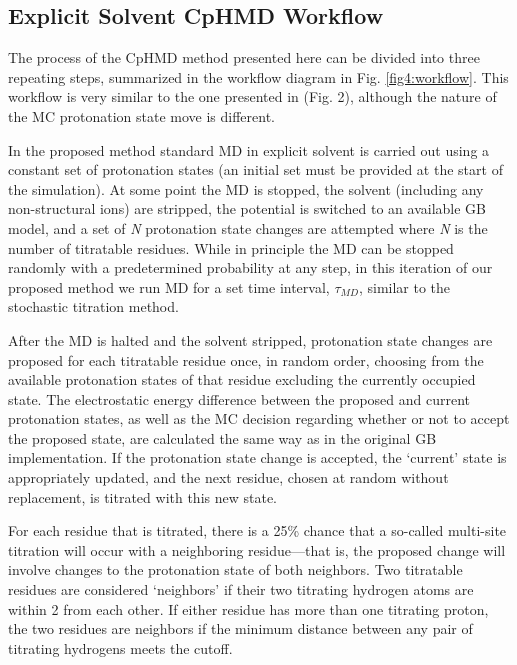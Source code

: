 \subsection{Explicit Solvent CpHMD Workflow}

The process of the CpHMD method presented here can be divided into three
repeating steps, summarized in the workflow diagram in Fig. \ref{fig4:workflow}.
This workflow is very similar to the one presented in
\citeauthor{Baptista_JChemPhys_2002_v117_p4184} (Fig. 2),
\cite{Baptista_JChemPhys_2002_v117_p4184} although the nature of the MC
protonation state move is different.

In the proposed method standard MD in explicit solvent is carried out using a
constant set of protonation states (an initial set must be provided at the start
of the simulation). At some point the MD is stopped, the solvent (including any
non-structural ions) are stripped, the potential is switched to an available GB
model, and a set of \emph{N} protonation state changes are attempted where
\emph{N} is the number of titratable residues. While in principle the MD can
be stopped randomly with a predetermined probability at any step, in this
iteration of our proposed method we run MD for a set time interval, $\tau_{MD}$,
similar to the stochastic titration method.
\cite{Baptista_JChemPhys_2002_v117_p4184}

After the MD is halted and the solvent stripped, protonation state changes are
proposed for each titratable residue once, in random order, choosing from the
available protonation states of that residue excluding the currently occupied
state. The electrostatic energy difference between the proposed and current
protonation states, as well as the MC decision regarding whether or not to
accept the proposed state, are calculated the same way as in the original GB
implementation. \cite{Mongan_JComputChem_2004_v25_p2038} If the protonation
state change is accepted, the `current' state is appropriately updated, and the
next residue, chosen at random without replacement, is titrated with this new
state.

For each residue that is titrated, there is a 25\% chance that a so-called
multi-site titration will occur with a neighboring residue---that is, the
proposed change will involve changes to the protonation state of both neighbors.
Two titratable residues are considered `neighbors' if their two titrating
hydrogen atoms are within 2 \text{\AA} from each other. If either residue has
more than one titrating proton, the two residues are neighbors if the minimum
distance between any pair of titrating hydrogens meets the cutoff.

